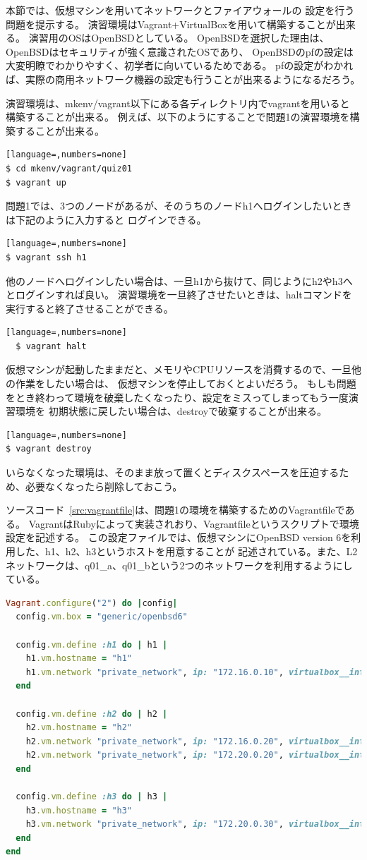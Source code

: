 
本節では、仮想マシンを用いてネットワークとファイアウォールの
設定を行う問題を提示する。
演習環境はVagrant+VirtualBoxを用いて構築することが出来る。
演習用のOSはOpenBSDとしている。
OpenBSDを選択した理由は、OpenBSDはセキュリティが強く意識されたOSであり、
OpenBSDのpfの設定は大変明瞭でわかりやすく、初学者に向いているためである。
pfの設定がわかれば、実際の商用ネットワーク機器の設定も行うことが出来るようになるだろう。

演習環境は、mkenv/vagrant以下にある各ディレクトリ内でvagrantを用いると
構築することが出来る。
例えば、以下のようにすることで問題1の演習環境を構築することが出来る。
\begin{lstlisting}[language=,numbers=none]
$ cd mkenv/vagrant/quiz01
$ vagrant up
\end{lstlisting}
問題1では、3つのノードがあるが、そのうちのノードh1へログインしたいときは下記のように入力すると
ログインできる。
\begin{lstlisting}[language=,numbers=none]
$ vagrant ssh h1
\end{lstlisting}
他のノードへログインしたい場合は、一旦h1から抜けて、同じようにh2やh3へとログインすれば良い。
演習環境を一旦終了させたいときは、haltコマンドを実行すると終了させることができる。
\begin{lstlisting}[language=,numbers=none]
  $ vagrant halt
\end{lstlisting}
仮想マシンが起動したままだと、メモリやCPUリソースを消費するので、一旦他の作業をしたい場合は、
仮想マシンを停止しておくとよいだろう。
もしも問題をとき終わって環境を破棄したくなったり、設定をミスってしまってもう一度演習環境を
初期状態に戻したい場合は、destroyで破棄することが出来る。
\begin{lstlisting}[language=,numbers=none]
$ vagrant destroy
\end{lstlisting}
いらなくなった環境は、そのまま放って置くとディスクスペースを圧迫するため、必要なくなったら削除しておこう。

ソースコード~\ref{src:vagrantfile}は、問題1の環境を構築するためのVagrantfileである。
VagrantはRubyによって実装されおり、Vagrantfileというスクリプトで環境設定を記述する。
この設定ファイルでは、仮想マシンにOpenBSD version 6を利用した、h1、h2、h3というホストを用意することが
記述されている。また、L2ネットワークは、q01\_a、q01\_bという2つのネットワークを利用するようにしている。
\begin{lstlisting}[language=Ruby,caption=演習問題1のVagrantfile,label=src:vagrantfile]
Vagrant.configure("2") do |config|
  config.vm.box = "generic/openbsd6"

  config.vm.define :h1 do | h1 |
    h1.vm.hostname = "h1"
    h1.vm.network "private_network", ip: "172.16.0.10", virtualbox__intnet: "q01_a"
  end

  config.vm.define :h2 do | h2 |
    h2.vm.hostname = "h2"
    h2.vm.network "private_network", ip: "172.16.0.20", virtualbox__intnet: "q01_a"
    h2.vm.network "private_network", ip: "172.20.0.20", virtualbox__intnet: "q01_b"
  end

  config.vm.define :h3 do | h3 |
    h3.vm.hostname = "h3"
    h3.vm.network "private_network", ip: "172.20.0.30", virtualbox__intnet: "q01_b"
  end
end
\end{lstlisting}


